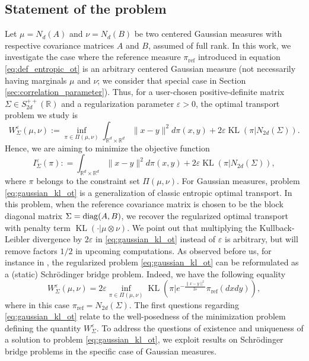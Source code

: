 \documentclass[]{article}
\def\diag{\mathop{\rm diag}\nolimits}
\DeclareMathOperator{\KL}{KL}
\DeclareMathOperator{\refe}{ref}
\numberwithin{equation}{section}
\theoremstyle{plain}
\begin{document}
\subsection{Statement of the problem}
Let $\mu = N_d(A)$ and $\nu = N_d(B)$ be two centered Gaussian measures with respective covariance matrices $A$ and $B$, assumed of full rank. In this work, we investigate the case where the reference measure $\pi_{\refe}$ introduced in equation \eqref{eq:def_entropic_ot} is an arbitrary centered Gaussian measure (not necessarily having marginals $\mu$ and $\nu$; we consider that special case in Section \ref{sec:correlation_parameter}). Thus, for a user-chosen positive-definite matrix $\Sigma \in S_{2d}^{++}(\mathbb{R})$ and a regularization parameter $\varepsilon > 0$, the optimal transport problem we study is
\begin{equation}\label{eq:gaussian_kl_ot}
    W_{\Sigma}^\varepsilon(\mu, \nu) := \inf_{\pi \in \Pi(\mu, \nu)} \int_{\mathbb{R}^d \times \mathbb{R}^d} \|x-y\|^2 d\pi(x,y) + 2\varepsilon \KL(\pi|N_{2d}(\Sigma)).
\end{equation}
Hence, we are aiming to minimize the objective function 
\begin{equation}\label{eq:objective_function}
	I_{\Sigma}^{\varepsilon}(\pi): = \int_{\mathbb{R}^d \times \mathbb{R}^d} \|x-y\|^2 d\pi(x,y) + 2\varepsilon \KL(\pi|N_{2d}(\Sigma)),
\end{equation}
where $\pi$ belongs to the constraint set $\Pi(\mu,\nu)$. For Gaussian measures, problem \eqref{eq:gaussian_kl_ot} is a generalization of classic entropic optimal transport. In this problem, when the reference covariance matrix is chosen to be the block diagonal matrix $\Sigma=\diag(A, B)$, we recover the regularized optimal transport with penalty term $\KL(\cdot| \mu \otimes \nu)$. We point out that multiplying the Kullback-Leibler divergence by $2\varepsilon$ in \eqref{eq:gaussian_kl_ot} instead of 
$\varepsilon$ is arbitrary, but will remove factors $1/2$ in upcoming computations. As observed before us, for instance in \cite{marino2020optimal, leonardsurveySchrodinger2013}, the regularized problem \eqref{eq:gaussian_kl_ot} can be reformulated as a (static) Schr\"{o}dinger bridge problem. Indeed, we have the following equality 
\begin{equation}\label{eq:schroed_pb}
	W_\Sigma^{\varepsilon}(\mu, \nu) = 2\varepsilon \inf_{\pi \in \Pi(\mu, \nu)} \KL\left(\pi | e^{-\frac{\|x-y\|^2}{2 \varepsilon}}\pi_{\refe}(dxdy) \right),
\end{equation}
where in this case $\pi_{\refe} = N_{2d}(\Sigma)$. The first questions regarding \eqref{eq:gaussian_kl_ot} relate to the well-posedness of the minimization problem defining the quantity $W_\Sigma^{\varepsilon}$. To address the questions of existence and uniqueness of a solution to problem \eqref{eq:gaussian_kl_ot}, we exploit results on Schr\"{o}dinger bridge problems in the specific case of Gaussian measures. 
\end{document}
